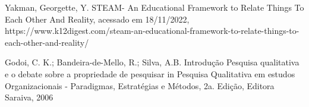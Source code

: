 \documentclass[
12pt,		%
openright,	%
twoside,  %
a4paper,			%
chapter=TITLE,		%
english,			%
french,				%
spanish,			%
brazil				%
]{USPSC-classe/USPSC}
\begin{document}
\begin{flushleft}
\begin{flushleft}
\begin{flushleft}
\begin{flushleft}
\begin{flushleft}
\begin{flushleft}
\begin{flushleft}
\begin{flushleft}
[YAKMAN, 2019] Yakman, Georgette, Y. STEAM- An Educational Framework to Relate Things To Each Other And Reality, acessado em 18/11/2022, https://www.k12digest.com/steam-an-educational-framework-to-relate-things-to-each-other-and-reality/
\end{flushleft}


\end{flushleft}


\end{flushleft}


\end{flushleft}


\end{flushleft}


\end{flushleft}


\end{flushleft}


\end{flushleft}


\begin{flushleft}
\begin{flushleft}
\begin{flushleft}
\begin{flushleft}
\begin{flushleft}
\begin{flushleft}
\begin{flushleft}
\begin{flushleft}
[GODOI et al., 2006] Godoi, C. K.; Bandeira-de-Mello, R.; Silva, A.B. Introdu\c{c}\~ao Pesquisa qualitativa e o debate sobre a propriedade de pesquisar in Pesquisa Qualitativa em estudos Organizacionais - Paradigmas, Estrat\'egias e M\'etodos, 2a. Edi\c{c}\~ao, Editora Saraiva, 2006
\end{flushleft}


\end{flushleft}


\end{flushleft}


\end{flushleft}


\end{flushleft}


\end{flushleft}


\end{flushleft}


\end{flushleft}
\end{document}
